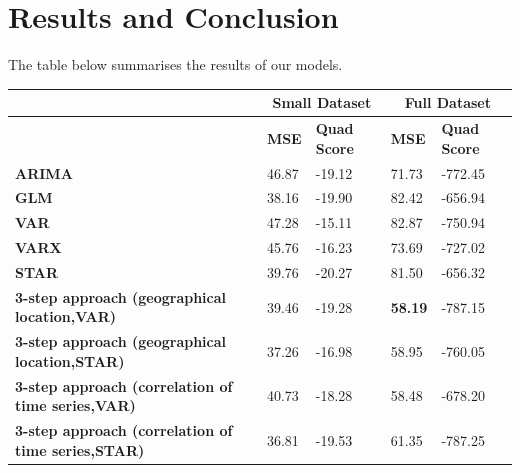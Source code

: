 \documentclass[nonblindrev,msom]{informs3} %
\begin{document}
\newpage
\section{Results and Conclusion}
The table below summarises the results of our models. 

\begin{table}[H]
\begin{tabular}{|l|l|l|l|l|}
\hline
                                                                      & \multicolumn{2}{c|}{\textbf{Small Dataset}} & \multicolumn{2}{c|}{\textbf{Full Dataset}} \\ \hline
                                                                      & \textbf{MSE}      & \textbf{Quad Score}     & \textbf{MSE}     & \textbf{Quad Score}     \\ \hline
\textbf{ARIMA}                                                        & 46.87             &      -19.12                   & 71.73            &                        -772.45 \\ \hline
\textbf{GLM}                                                          & 38.16             & -19.90                  & 82.42            & -656.94                 \\ \hline
\textbf{VAR}                                                          & 47.28             &   -15.11                      & 82.87            &    -750.94                     \\ \hline
\textbf{VARX}                                                         & 45.76             &  -16.23                       & 73.69            &     -727.02                    \\ \hline
\textbf{STAR}                                                         & 39.76             & -20.27                  & 81.50            & -656.32                 \\ \hline
\textbf{3-step approach (geographical location,VAR)}      & 39.46 &                        -19.28 & \textbf{58.19}            & -787.15                 \\ \hline
\textbf{3-step approach (geographical location,STAR)}      & 37.26 &                        -16.98 & 58.95            & -760.05             \\ \hline
\textbf{3-step approach (correlation of time series,VAR)} & 40.73             &      -18.28                  & 58.48           & -678.20                 \\ \hline
\textbf{3-step approach (correlation of time series,STAR)} & 36.81 &      -19.53                 & 61.35           & -787.25              \\ \hline

\end{tabular}
\end{table}
\end{document}
